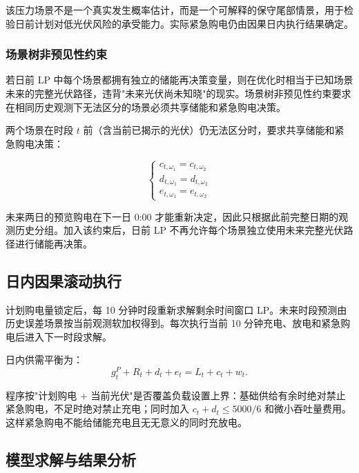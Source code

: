 \documentclass[withoutpreface,bwprint]{cumcmthesis} %
\begin{document}
该压力场景不是一个真实发生概率估计，而是一个可解释的保守尾部情景，用于检验日前计划对低光伏风险的承受能力。实际紧急购电仍由因果日内执行结果确定。

\subsubsection{场景树非预见性约束}
若日前 LP 中每个场景都拥有独立的储能再决策变量，则在优化时相当于已知场景未来的完整光伏路径，违背"未来光伏尚未知晓"的现实。场景树非预见性约束要求在相同历史观测下无法区分的场景必须共享储能和紧急购电决策。

两个场景在时段 $t$ 前（含当前已揭示的光伏）仍无法区分时，要求共享储能和紧急购电决策：

\begin{equation}
	\left\{
	\begin{aligned}
    c_{t,\omega_1}=c_{t,\omega_2}\\
    d_{t,\omega_1}=d_{t,\omega_2}\\
    e_{t,\omega_1}=e_{t,\omega_2}
	\end{aligned}
	\right.
\end{equation}
\vspace{5pt}



未来两日的预览购电在下一日 0:00 才能重新决定，因此只根据此前完整日期的观测历史分组。加入该约束后，日前 LP 不再允许每个场景独立使用未来完整光伏路径进行储能再决策。

\subsection{日内因果滚动执行}

计划购电量锁定后，每 10 分钟时段重新求解剩余时间窗口 LP。未来时段预测由历史误差场景按当前观测软加权得到。每次执行当前 10 分钟充电、放电和紧急购电后进入下一时段求解。

日内供需平衡为：
\begin{equation}
    g^P_t + R_t + d_t + e_t = L_t + c_t + w_t.
    \label{eq:q2-realtime-balance}
\end{equation}

程序按"计划购电 + 当前光伏"是否覆盖负载设置上界：基础供给有余时绝对禁止紧急购电，不足时绝对禁止充电；同时加入 $c_t+d_t\le 5000/6$ 和微小吞吐量费用。这样紧急购电不能给储能充电且无无意义的同时充放电。

\subsection{模型求解与结果分析}
\end{document}
